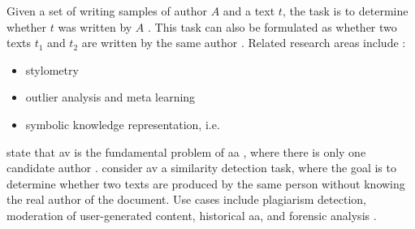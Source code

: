 \begin{definition}
    [\ac{av}]   %
    Given a set of writing samples of author $A$ and a text $t$,    %
    the task is to determine whether $t$ was written by $A$ \cite{stein_intrinsic_2011,stamatatos_survey_2009,koppel_authorship_2011,tyo_state_2022,kocher_unine_2015}.
    This task can also be formulated as whether two texts $t_1$ and $t_2$ are written by the same author 
    \cite{bevendorff_generalizing_2019,bevendorff_divergence_based_2020,embarcadero_ruiz_graph_based_2022,rivera_soto_learning_2021,ordonez_will_2020,futrzynski_pairwise_2021,weerasinghe_feature_vector_difference_2021}.
    Related research areas include \cite{stein_intrinsic_2011}:
    \begin{itemize}
        \item stylometry
        \item outlier analysis and meta learning
        \item symbolic knowledge representation, i.e. 
    \end{itemize}
    \citet{tyo_state_2022} state that \ac{av} is the fundamental problem of \ac{aa} \cite{tyo_state_2022}, 
    where there is only one candidate author \cite{barlas_cross_domain_2020}.
    \citet{elmanarelbouanani_authorship_2014} consider \ac{av} a similarity detection task, 
    where the goal is to determine whether two texts are produced by the same person without knowing the real author of the document.
    Use cases include plagiarism detection, moderation of user-generated content, historical \ac{aa}, and forensic analysis \cite{rivera_soto_learning_2021}.
\end{definition}

